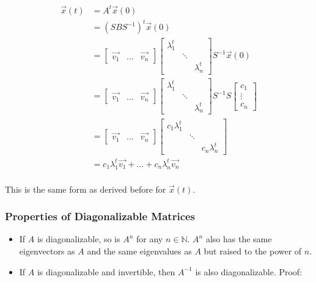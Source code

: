 \documentclass[12pt]{article}
\begin{document}
{{\begin{align*}
    \vec{x}(t) &= A^t\vec{x}(0)\\
    &= (SBS^{-1})^t\vec{x}(0)\\
    &= \begin{bmatrix}
        \vec{v_1} & \dots & \vec{v_n}
    \end{bmatrix}\begin{bmatrix}
        \lambda_1^t & & \\
        & \ddots & \\
        & & \lambda_n^t
    \end{bmatrix}S^{-1} \vec{x}(0)\\
    &= \begin{bmatrix}
        \vec{v_1} & \dots & \vec{v_n}
    \end{bmatrix}\begin{bmatrix}
        \lambda_1^t & & \\
        & \ddots & \\
        & & \lambda_n^t
    \end{bmatrix}S^{-1}S\begin{bmatrix}
        c_1\\
        \vdots\\
        c_n
    \end{bmatrix}\\
    &= \begin{bmatrix}
        \vec{v_1} & \dots & \vec{v_n}
    \end{bmatrix}\begin{bmatrix}
       c_1 \lambda_1^t & & \\
        & \ddots & \\
        & & c_n\lambda_n^t
    \end{bmatrix}\\
    &= c_1 \lambda_1^t\vec{v_1} + \dots + c_n\lambda_n^t\vec{v_n}\\
\end{align*}

This is the same form as derived before for $\vec{x}(t)$.

\subsubsection{Properties of Diagonalizable Matrices}

\begin{itemize}
    \item If $A$ is diagonalizable, so is $A^n$ for any $n \in \mathbb{N}$. $A^n$ also has the same eigenvectors as $A$ and the same eigenvalues as $A$ but raised to the power of $n$.
    \item If $A$ is diagonalizable and invertible, then $A^{-1}$ is also diagonalizable. Proof:
    

\end{itemize}}}
\end{document}
